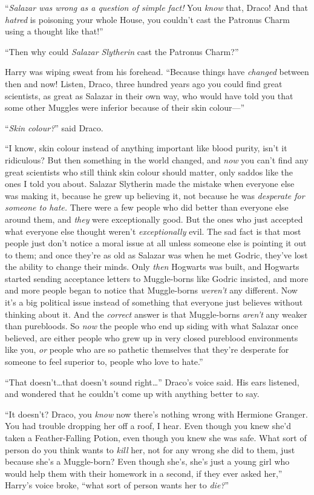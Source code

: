 “\emph{Salazar was wrong as a question of simple fact!} You \emph{know} that, Draco! And that \emph{hatred} is poisoning your whole House, you couldn’t cast the Patronus Charm using a thought like that!”

“Then why could \emph{Salazar Slytherin} cast the Patronus Charm?”

Harry was wiping sweat from his forehead. “Because things have \emph{changed} between then and now! Listen, Draco, three hundred years ago you could find great scientists, as great as Salazar in their own way, who would have told you that some other Muggles were inferior because of their skin colour—”

“\emph{Skin colour?}” said Draco.

“I know, skin colour instead of anything important like blood purity, isn’t it ridiculous? But then something in the world changed, and \emph{now} you can’t find any great scientists who still think skin colour should matter, only saddos like the ones I told you about. Salazar Slytherin made the mistake when everyone else was making it, because he grew up believing it, not because he was \emph{desperate for someone to hate.} There were a few people who did better than everyone else around them, and \emph{they} were exceptionally good. But the ones who just accepted what everyone else thought weren’t \emph{exceptionally} evil. The sad fact is that most people just don’t notice a moral issue at all unless someone else is pointing it out to them; and once they’re as old as Salazar was when he met Godric, they’ve lost the ability to change their minds. Only \emph{then} Hogwarts was built, and Hogwarts started sending acceptance letters to Muggle-borns like Godric insisted, and more and more people began to notice that Muggle-borns \emph{weren’t} any different. Now it’s a big political issue instead of something that everyone just believes without thinking about it. And the \emph{correct} answer is that Muggle-borns \emph{aren’t} any weaker than purebloods. So \emph{now} the people who end up siding with what Salazar once believed, are either people who grew up in very closed pureblood environments like you, \emph{or} people who are so pathetic themselves that they’re desperate for someone to feel superior to, people who love to hate.”

“That doesn’t…that doesn’t sound right…” Draco’s voice said. His ears listened, and wondered that he couldn’t come up with anything better to say.

“It doesn’t? Draco, you \emph{know} now there’s nothing wrong with Hermione Granger. You had trouble dropping her off a roof, I hear. Even though you knew she’d taken a Feather-Falling Potion, even though you knew she was safe. What sort of person do you think wants to \emph{kill} her, not for any wrong she did to them, just because she’s a Muggle-born? Even though she’s, she’s just a young girl who would help them with their homework in a second, if they ever asked her,” Harry’s voice broke, “what sort of person wants her to \emph{die?}”

